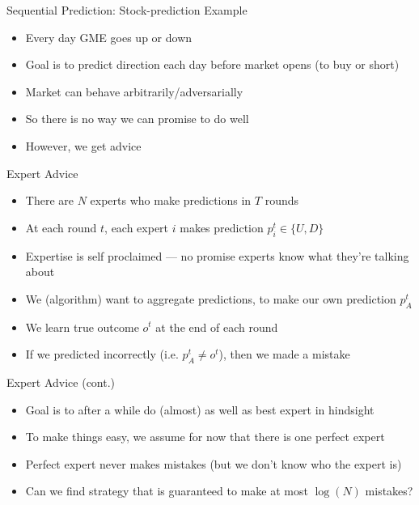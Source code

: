 \documentclass[11pt,aspectratio=169,handout]{beamer}
\begin{document}
  \begin{frame}{Sequential Prediction: Stock-prediction Example}
   \begin{itemize}[<+->]
   \setlength{\itemsep}{1.2em}
    \item Every day GME goes \alert{up} or \alert{down}
    \item Goal is to predict direction each day before market opens (to buy or short)
    \item Market can behave arbitrarily/adversarially
    \item So there is no way we can promise to do \alert{well}
    \item However, we get \alert{advice}
   \end{itemize}
  \end{frame}
  
  
  \begin{frame}{Expert Advice}
   \begin{itemize}[<+->]
   \setlength{\itemsep}{1em}
    \item There are $N$ \alert{experts} who make predictions in $T$ rounds
    \item At each round $t$, each expert $i$ makes prediction $p_i^t \in \{U, D\}$
    \item Expertise is self proclaimed --- no promise experts know what they're talking about
    \item We (algorithm) want to aggregate predictions, to make our own prediction $p_A^t$
    \item We learn true outcome $o^t$ at the end of each round
    \item If we predicted incorrectly (i.e. $p_A^t \neq o^t$), then we \alert{made a mistake}
   \end{itemize}
  \end{frame}
  
  
  \begin{frame}{Expert Advice (cont.)}
   \begin{itemize}[<+->]
   \setlength{\itemsep}{1em}
    \item Goal is to after a while do (almost) as well as \alert{best} expert in hindsight
    \item To make things easy, we assume for now that there is one \alert{perfect} expert
    \item Perfect expert never makes mistakes (but we don't know who the expert is)
    \item Can we find strategy that is guaranteed to make at most $\log(N)$ mistakes?
   \end{itemize}
  \end{frame}
  
\end{document}
